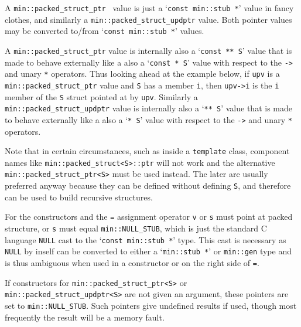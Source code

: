 \documentclass[12pt]{article}
\newcommand{\EOL}{\penalty \exhyphenpenalty}
\begin{document}
A {\tt min::\EOL packed\_\EOL struct\_\EOL ptr \SARG} value is just
a `{\tt const min::stub~*}' value in fancy clothes,
and similarly a {\tt min::\EOL packed\_\EOL struct\_\EOL updptr\SARG} value.
Both pointer values may be converted to/from
`{\tt const min::stub~*}' values.

A {\tt min::\EOL packed\_\EOL struct\_\EOL ptr\SARG} value is internally
also a `\verb|const ** S|' value that is made to behave externally like a
also a `\verb|const * S|' value with respect to the \verb|->| and
unary \verb|*| operators.  Thus looking ahead at the example below,
if \verb|upv| is a
{\tt min::\EOL packed\_\EOL struct\_\EOL ptr\SARG} value
and \verb|S| has a member \verb|i|, then \verb|upv->i| is the \verb|i|
member of the \verb|S| struct pointed at by \verb|upv|.
Similarly a {\tt min::\EOL packed\_\EOL struct\_\EOL updptr\SARG} value
is internally also a `\verb|** S|' value that is made to behave
externally like a also a `\verb|* S|' value with respect to the \verb|->| and
unary \verb|*| operators.

Note that in certain
circumstances, such as inside a {\tt template} class,
component names like {\tt min::\EOL packed\_\EOL struct<S>::ptr} will not work
and the alternative {\tt min::\EOL packed\_\EOL struct\_\EOL ptr<S>}
must be used instead.  The later are usually preferred anyway because
they can be defined without defining \verb|S|, and therefore can be
used to build recursive structures.

For the constructors and the {\tt =} assignment operator \verb|v| or
\verb|s| must point at packed structure, or \verb|s| must equal
\verb|min::NULL_STUB|, which is just the standard C language \verb|NULL|
cast to the `\verb|const min::stub *|' type.  This cast is necessary
as \verb|NULL| by inself can be converted to either a `\verb|min::stub *|'
or \verb|min::gen| type and is thus ambiguous when used in a constructor
or on the right side of \verb|=|.

If constructors for {\tt min::\EOL packed\_\EOL struct\_\EOL ptr<S>} or
{\tt min::\EOL packed\_\EOL struct\_\EOL updptr<S>} are
not given an argument, these pointers are set to
\verb|min::NULL_STUB|.  Such pointers give undefined results if
used, though most frequently the result will be a memory fault.
\end{document}
